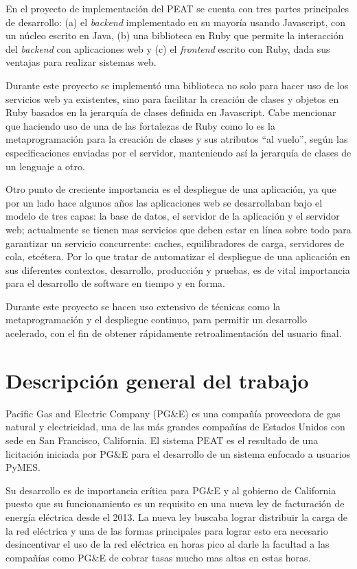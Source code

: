 \documentclass{article}
\begin{document}
En el proyecto de implementación del PEAT se cuenta con tres partes principales
de desarrollo: (a) el \textit{backend}  implementado en su mayoría usando
Javascript, con un núcleo escrito en Java, (b) una biblioteca en Ruby que permite
la interacción del \textit{backend} con aplicaciones web y (c) el \textit{frontend}
escrito con Ruby, dada sus ventajas para realizar sistemas web.

Durante este proyecto se implementó una biblioteca no solo para hacer uso de
los servicios web ya existentes, sino para facilitar la creación
de clases y objetos en Ruby basados en la jerarquía de clases definida
en Javascript. Cabe mencionar que haciendo uso de una de las fortalezas de Ruby
como lo es la metaprogramación para la creación de clases y sus
atributos ``al vuelo'', según las especificaciones enviadas por el servidor,
manteniendo así la jerarquía de clases de un lenguaje a otro.

Otro punto de creciente importancia es el despliegue de una aplicación, ya que por un
lado hace algunos años las aplicaciones web se desarrollaban bajo el modelo de
tres capas: la base de datos, el servidor de la aplicación y el servidor web; actualmente se tienen mas servicios
que deben estar en línea sobre todo para garantizar un servicio concurrente:
caches, equilibradores de carga, servidores de cola, etcétera. Por lo que tratar
de automatizar el despliegue de una aplicación en sus diferentes contextos,
desarrollo, producción y pruebas, es de vital importancia para el desarrollo
de software en tiempo y en forma.

Durante este proyecto se hacen uso extensivo de técnicas como la metaprogramación
y el despliegue continuo, para permitir un desarrollo acelerado, con el fin de
obtener rápidamente retroalimentación del usuario final.

\section{Descripción general del trabajo}
Pacific Gas and Electric Company (PG\&E) es una compañía proveedora de gas natural
y electricidad, una de las más grandes compañías de Estados Unidos con sede en
San Francisco, California. El sistema PEAT es el resultado de una licitación
iniciada por PG\&E para el desarrollo de un sistema enfocado a usuarios PyMES.

Su desarrollo es de importancia crítica para PG\&E y al gobierno de
California puesto que su funcionamiento es un requisito en una nueva
ley de facturación de energía eléctrica desde el 2013. La nueva ley buscaba
lograr distribuir la carga de la red eléctrica y una de las formas
principales para lograr esto era necesario desincentivar el uso de la red
eléctrica en horas pico al darle la facultad a las compañías como PG\&E
de cobrar tasas mucho mas altas en estas horas.
\end{document}
